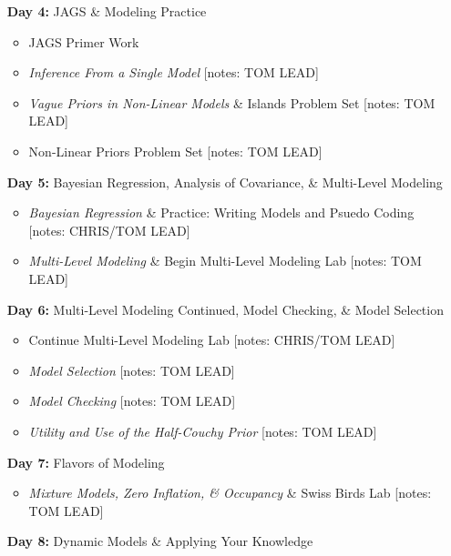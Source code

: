 \documentclass[11pt]{article}
\begin{document}
\begin{enumerate}
\item[\textbf{Day 4:}] JAGS \& Modeling Practice

\begin{itemize}
\item JAGS Primer Work
\item \emph{Inference From a Single Model}  [notes: TOM LEAD]
\item \emph{Vague Priors in Non-Linear Models} \& Islands Problem Set  [notes: TOM LEAD] 
\item Non-Linear Priors Problem Set  [notes: TOM LEAD]
\end{itemize}

\item[\textbf{Day 5:}] Bayesian Regression, Analysis of Covariance, \& Multi-Level Modeling

\begin{itemize}
\item \emph{Bayesian Regression} \& Practice: Writing Models and Psuedo Coding [notes: CHRIS/TOM LEAD]
\item \emph{Multi-Level Modeling} \& Begin Multi-Level Modeling Lab  [notes: TOM LEAD] 
\end{itemize}

\newpage

\item[\textbf{Day 6:}] Multi-Level Modeling Continued, Model Checking, \& Model Selection

\begin{itemize}
\item  Continue Multi-Level Modeling Lab  [notes: CHRIS/TOM LEAD]
\item \emph{Model Selection} [notes: TOM LEAD]
\item \emph{Model Checking} [notes: TOM LEAD] 
\item \emph{Utility and Use of the Half-Couchy Prior} [notes: TOM LEAD]
\end{itemize}

\item[\textbf{Day 7:}] Flavors of Modeling

\begin{itemize}
\item \emph{Mixture Models, Zero Inflation, \& Occupancy} \& Swiss Birds Lab [notes: TOM LEAD]
\end{itemize}

\item[\textbf{Day 8:}] Dynamic Models \& Applying Your Knowledge


\end{enumerate}
\end{document}
